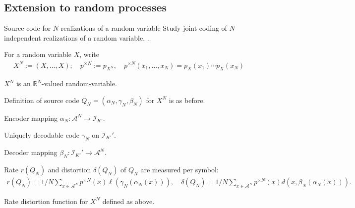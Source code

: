 %
\subsection{Extension to random processes}
\begin{frame}{Source code for $N$ realizations of a random variable} 
 Study joint coding of $N$ independent realizations of a random variable. .
\bit
\item For a random variable $X$, write 
\begin{align*}
X^N:=(X,\dots,X); \quad p^{\times N}:=p_{X^N},\quad  p^{\times N}(x_1,\dots,x_N)=p_X(x_1)\cdots p_X(x_N)
\end{align*}
\item $X^N$ is an $\mathbb{R}^N$-valued random-variable.  
\item Definition of source code $Q_N=(\alpha_N,\gamma_N,\beta_N)$  for $X^N$ is as before.
\bit
\item Encoder mapping $\alpha_N:\mathcal{A}^N\to \mathcal{I}_{K'}$.
\item Uniquely decodable code $\gamma_N$ on $\mathcal{I}_{K'}'$.
\item Decoder mapping $\beta_N:\mathcal{I}_{K'}'\to\mathcal{A}^N$. 
\eit
\item Rate $r(Q_N)$  and distortion $\delta(Q_N)$ of $Q_N$ are measured per symbol: 
\begin{align*}
r(Q_N)=1/N\sum_{x\in\mathcal{A}^N}p^{\times N}(x)\ell(\gamma_N(\alpha_N(x))), \quad \delta(Q_N)= 1/N\sum_{x\in\mathcal{A}^N}p^{\times N}(x)d(x,\beta_N(\alpha_N(x))).
\end{align*} 
\item[\iarrow] Rate distortion function for $X^N$ defined as above. 
\eit
\end{frame}


